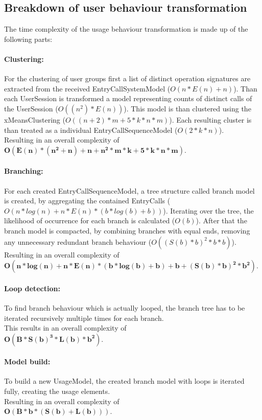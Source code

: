 \documentclass[10pt,a4paper]{article}
\begin{document}
\subsection{Breakdown of user behaviour transformation}
The time complexity of the usage behaviour transformation is made up of the following parts:

\paragraph{Clustering:}
For the clustering of user groups first a list of distinct operation signatures are extracted from the received EntryCallSystemModel ($O(n*E(n) + n)$). Than each UserSession is transformed a model representing counts of distinct calls of the UserSession ($O((n^2)*E(n))$). This model is than clustered using the xMeansClustering ($O((n+2) * m + 5 * k * n * m)$). Each resulting cluster is than treated as a individual EntryCallSequenceModel ($O(2 * k * n)$).\\
Resulting in an overall complexity of \\$\mathbf{O(E(n) * (n^2 + n) + n + n^2 * m * k + 5 * k * n * m)}$.
\paragraph{Branching:} 
For each created EntryCallSequenceModel, a tree structure called branch model is created, by aggregating the contained EntryCalls ($O(n * log(n) + n * E(n) * (b * log(b) + b))$). Iterating over the tree, the likelihood of occurrence for each branch is calculated ($O(b)$). After that the branch model is compacted, by combining branches with equal ends, removing any unnecessary redundant branch behaviour ($O((S(b) * b)^2 * b * b) $).\\
Resulting in an overall complexity of \\$\mathbf{O(n * log(n) + n * E(n) * (b * log(b) + b) + b + (S(b) * b)^2 * b^2)}$.

\paragraph{Loop detection:}
To find branch behaviour which is actually looped, the branch tree has to be iterated recursively multiple times for each branch.\\
This results in an overall complexity of \\$\mathbf{O(B * S(b)^3 * L(b) * b^2)}$.

\paragraph{Model build:} 
To build a new UsageModel, the created branch model with loops is iterated fully, creating the usage elements.\\
Resulting in an overall complexity of \\$\mathbf{O(B * b * (S(b) + L(b)))}$.\\
\newpage
\end{document}
